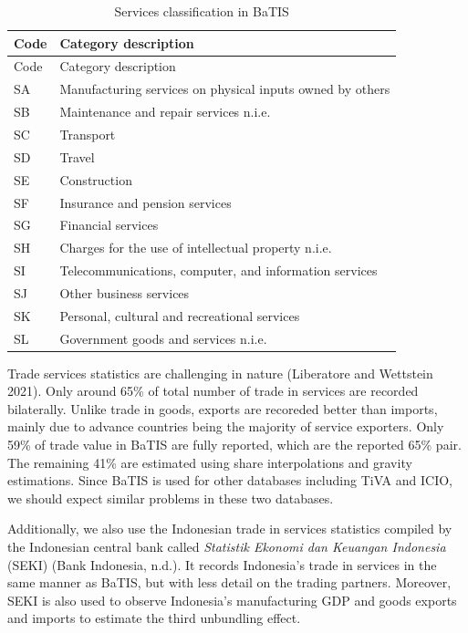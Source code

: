 \documentclass[
  a4paper,
  DIV=11,
  numbers=noendperiod]{scrreprt}
\begin{document}
\begin{longtable}[]{@{}ll@{}}
\caption{Services classification in BaTIS}\label{tbl-1}\tabularnewline
\toprule\noalign{}
Code & Category description \\
\midrule\noalign{}
\endfirsthead
\toprule\noalign{}
Code & Category description \\
\midrule\noalign{}
\endhead
\bottomrule\noalign{}
\endlastfoot
SA & Manufacturing services on physical inputs owned by others \\
SB & Maintenance and repair services n.i.e. \\
SC & Transport \\
SD & Travel \\
SE & Construction \\
SF & Insurance and pension services \\
SG & Financial services \\
SH & Charges for the use of intellectual property n.i.e. \\
SI & Telecommunications, computer, and information services \\
SJ & Other business services \\
SK & Personal, cultural and recreational services \\
SL & Government goods and services n.i.e. \\
\end{longtable}

Trade services statistics are challenging in nature (Liberatore and
Wettstein 2021). Only around 65\% of total number of trade in services
are recorded bilaterally. Unlike trade in goods, exports are recoreded
better than imports, mainly due to advance countries being the majority
of service exporters. Only 59\% of trade value in BaTIS are fully
reported, which are the reported 65\% pair. The remaining 41\% are
estimated using share interpolations and gravity estimations. Since
BaTIS is used for other databases including TiVA and ICIO, we should
expect similar problems in these two databases.

Additionally, we also use the Indonesian trade in services statistics
compiled by the Indonesian central bank called \emph{Statistik Ekonomi
dan Keuangan Indonesia} (SEKI) (Bank Indonesia, n.d.). It records
Indonesia's trade in services in the same manner as BaTIS, but with less
detail on the trading partners. Moreover, SEKI is also used to observe
Indonesia's manufacturing GDP and goods exports and imports to estimate
the third unbundling effect.
\end{document}
